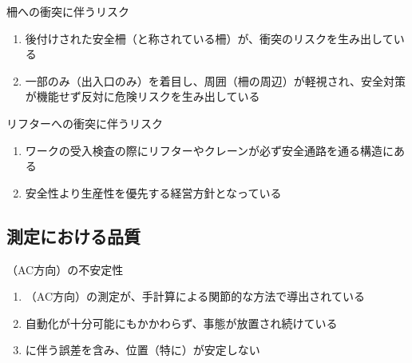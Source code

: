 \begin{Issues}{柵への衝突に伴うリスク}
\begin{enumerate}[label=\sarrow]
\item 後付けされた安全柵（と称されている柵）が、衝突のリスクを生み出している
\item 一部のみ（出入口のみ）を着目し、周囲（柵の周辺）が軽視され、安全対策が機能せず反対に危険リスクを生み出している
\end{enumerate}
\end{Issues}

\clearpage
\begin{Issues}{リフターへの衝突に伴うリスク}
\begin{enumerate}[label=\sarrow]
\item ワークの受入検査の際にリフターやクレーンが必ず安全通路を通る構造にある
\item 安全性より生産性を優先する経営方針となっている
\end{enumerate}
\end{Issues}


\clearpage


\subsection{測定における品質}

\begin{Issues}{\KeywayCenterMeasurement（AC方向）の不安定性}
\begin{enumerate}[label=\sarrow]
\item[{\sarrow[red]}]\KeywayCenter（AC方向）の測定が、手計算による関節的な方法で導出されている
\item[{\sarrow[red]}]自動化が十分可能にもかかわらず、事態が放置され続けている
\item[{\sarrow[red]}]\CenterCurvature に伴う誤差を含み、位置（特に\AsideKeywayDepth）が安定しない
\end{enumerate}
\end{Issues}

